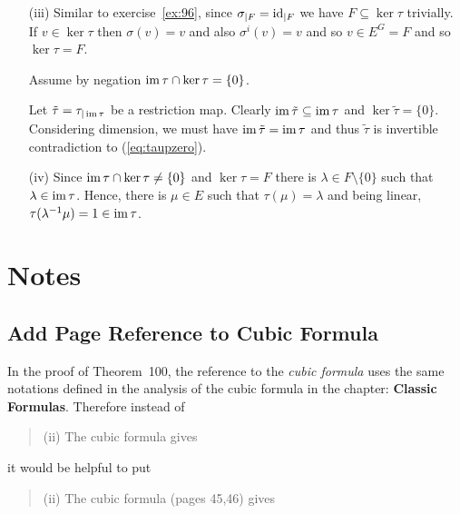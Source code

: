 \begin{myenumerate}
\begin{itemize}
 \item[(iii)]
    Similar to exercise~\ref{ex:96},
    since \(\sigma_{|F} = \mathop{\rm id}\nolimits_{|F}\) we have
    \(F \subseteq \ker \tau\) trivially.
    If \(v\in \ker\tau\) then \(\sigma(v)=v\) and also
    \(\sigma^i(v)=v\) and so \(v\in E^G = F\) and so \(\ker\tau = F\).

    Assume  by negation \(\mathop{\rm im}\nolimits\tau \cap \mathop{\rm ker}\nolimits\tau = \{0\}\).

    Let \(\tilde{\tau} = \tau_{|\mathop{\rm im}\nolimits\tau}\) be a
    restriction map. Clearly \(\mathop{\rm im}\nolimits\tilde{\tau} \subseteq \mathop{\rm im}\nolimits\tau\)
    and \(\ker\tilde{\tau} = \{0\}\). Considering dimension, we must have
    \(\mathop{\rm im}\nolimits\tilde{\tau} = \mathop{\rm im}\nolimits\tau\) and thus \(\tilde{\tau}\) is invertible
    contradiction to (\ref{eq:taupzero}).

 \item[(iv)]
    Since \(\mathop{\rm im}\nolimits\tau \cap \mathop{\rm ker}\nolimits\tau \neq \{0\}\) and \(\ker\tau = F\)
    there is \(\lambda\in F\setminus\{0\}\) such that \(\lambda\in \mathop{\rm im}\nolimits\tau\).
    Hence, there is \(\mu\in E\) such that \(\tau(\mu) = \lambda\)
    and being linear, \(\tau(\lambda^{-1}\mu) = 1 \in \mathop{\rm im}\nolimits\tau\).
\end{itemize}

\end{myenumerate}


\section{Notes}


\subsection{Add Page Reference to Cubic Formula}

In the proof of Theorem~100,
the reference to the \emph{cubic formula} uses the same notations
defined in the analysis of the cubic formula
in the chapter: \textbf{Classic Formulas}.
Therefore instead of
\begin{quotation}
(ii) The cubic formula gives \mldots
\end{quotation}
it would be helpful to put
\begin{quotation}
(ii) The cubic formula (pages 45,46) gives \mldots
\end{quotation}


